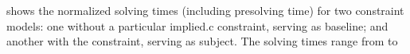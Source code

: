 \renewcommand{\thefigure}{\oldthefigure}

 shows the normalized
solving times (including presolving time) for two \glspl{constraint model}: one
without a particular \gls{implied.c} \gls{constraint}, serving as
\gls{baseline}; and another with the \gls{constraint}, serving as \gls{subject}.
%
The solving times range from
\SIMinOf{
  \SolvTechDisableImplConsDefsDominateDefsPrePlusSolvingTimeSpeedupAllPrePlusSolvingTimeAvgMin,
  \SolvTechDisableImplConsDefsDominateDefsPrePlusSolvingTimeSpeedupPrePlusSolvingTimeAvgMin,
  \SolvTechDisableImplConsDefsInSpannedBlocksPrePlusSolvingTimeSpeedupPrePlusSolvingTimeAvgMin,
  \SolvTechDisableImplConsIdenticalEntryBlocksPrePlusSolvingTimeSpeedupPrePlusSolvingTimeAvgMin,
  \SolvTechDisableImplConsDefsDominateEntryBlocksPrePlusSolvingTimeSpeedupPrePlusSolvingTimeAvgMin,
  \SolvTechDisableImplConsPlacePhiOpsSameAsDefEdgesPrePlusSolvingTimeSpeedupPrePlusSolvingTimeAvgMin,
  \SolvTechDisableImplConsNoSpanUsesPrePlusSolvingTimeSpeedupPrePlusSolvingTimeAvgMin,
  \SolvTechDisableImplConsNoSpanDefsPrePlusSolvingTimeSpeedupPrePlusSolvingTimeAvgMin,
  \SolvTechDisableImplConsNoSpanUseDefsPrePlusSolvingTimeSpeedupPrePlusSolvingTimeAvgMin,
  \SolvTechDisableImplConsSpannedInputPrePlusSolvingTimeSpeedupPrePlusSolvingTimeAvgMin,
  \SolvTechDisableImplConsUsedDataMustBeAvailablePrePlusSolvingTimeSpeedupPrePlusSolvingTimeAvgMin,
  \SolvTechDisableImplConsExteriorDataMustBeAvailablePrePlusSolvingTimeSpeedupPrePlusSolvingTimeAvgMin,
  \SolvTechDisableImplConsLocsOfUsesPrePlusSolvingTimeSpeedupPrePlusSolvingTimeAvgMin,
  \SolvTechDisableImplConsLocsOfDefsPrePlusSolvingTimeSpeedupPrePlusSolvingTimeAvgMin,
  \SolvTechDisableImplConsFixFallThroughsPrePlusSolvingTimeSpeedupPrePlusSolvingTimeAvgMin
}{\s} to
\SIMaxOf[round-precision=0]{
  \SolvTechDisableImplConsDefsDominateDefsPrePlusSolvingTimeSpeedupAllPrePlusSolvingTimeAvgMax,
  \SolvTechDisableImplConsDefsDominateDefsPrePlusSolvingTimeSpeedupPrePlusSolvingTimeAvgMax,
  \SolvTechDisableImplConsDefsInSpannedBlocksPrePlusSolvingTimeSpeedupPrePlusSolvingTimeAvgMax,
  \SolvTechDisableImplConsIdenticalEntryBlocksPrePlusSolvingTimeSpeedupPrePlusSolvingTimeAvgMax,
  \SolvTechDisableImplConsDefsDominateEntryBlocksPrePlusSolvingTimeSpeedupPrePlusSolvingTimeAvgMax,
  \SolvTechDisableImplConsPlacePhiOpsSameAsDefEdgesPrePlusSolvingTimeSpeedupPrePlusSolvingTimeAvgMax,
  \SolvTechDisableImplConsNoSpanUsesPrePlusSolvingTimeSpeedupPrePlusSolvingTimeAvgMax,
  \SolvTechDisableImplConsNoSpanDefsPrePlusSolvingTimeSpeedupPrePlusSolvingTimeAvgMax,
  \SolvTechDisableImplConsNoSpanUseDefsPrePlusSolvingTimeSpeedupPrePlusSolvingTimeAvgMax,
  \SolvTechDisableImplConsSpannedInputPrePlusSolvingTimeSpeedupPrePlusSolvingTimeAvgMax,
  \SolvTechDisableImplConsUsedDataMustBeAvailablePrePlusSolvingTimeSpeedupPrePlusSolvingTimeAvgMax,
  \SolvTechDisableImplConsExteriorDataMustBeAvailablePrePlusSolvingTimeSpeedupPrePlusSolvingTimeAvgMax,
  \SolvTechDisableImplConsLocsOfUsesPrePlusSolvingTimeSpeedupPrePlusSolvingTimeAvgMax,
  \SolvTechDisableImplConsLocsOfDefsPrePlusSolvingTimeSpeedupPrePlusSolvingTimeAvgMax,
  \SolvTechDisableImplConsFixFallThroughsPrePlusSolvingTimeSpeedupPrePlusSolvingTimeAvgMax
}{\s}
